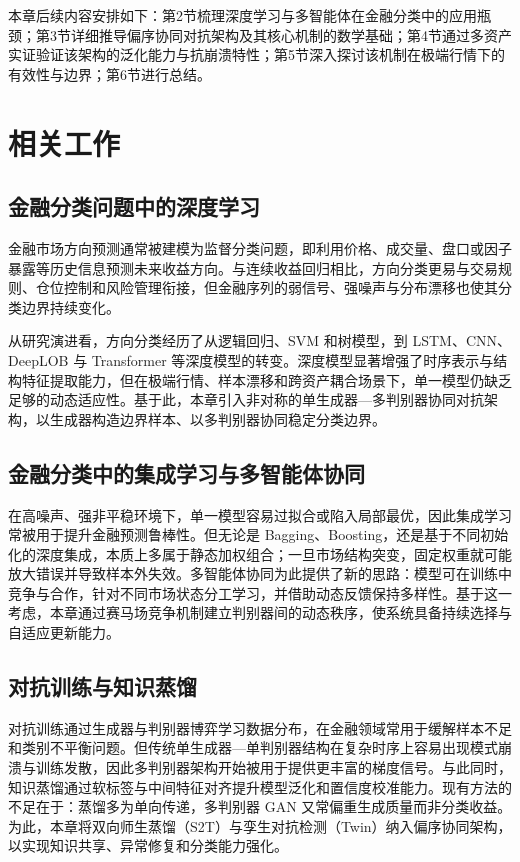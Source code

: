 本章后续内容安排如下：第2节梳理深度学习与多智能体在金融分类中的应用瓶颈；第3节详细推导偏序协同对抗架构及其核心机制的数学基础；第4节通过多资产实证验证该架构的泛化能力与抗崩溃特性；第5节深入探讨该机制在极端行情下的有效性与边界；第6节进行总结。

\section{相关工作}

\subsection{金融分类问题中的深度学习}

金融市场方向预测通常被建模为监督分类问题，即利用价格、成交量、盘口或因子暴露等历史信息预测未来收益方向。与连续收益回归相比，方向分类更易与交易规则、仓位控制和风险管理衔接，但金融序列的弱信号、强噪声与分布漂移也使其分类边界持续变化。

从研究演进看，方向分类经历了从逻辑回归、SVM 和树模型，到 LSTM、CNN、DeepLOB 与 Transformer 等深度模型的转变\cite{fischer2018deep,chen2019attlstm,sezer2018algorithmic,zhang2019DeepLOB,vaswani2017attention,ding2020hmsg,yoo2021dtml}。深度模型显著增强了时序表示与结构特征提取能力，但在极端行情、样本漂移和跨资产耦合场景下，单一模型仍缺乏足够的动态适应性。基于此，本章引入非对称的单生成器—多判别器协同对抗架构，以生成器构造边界样本、以多判别器协同稳定分类边界。

\subsection{金融分类中的集成学习与多智能体协同}

在高噪声、强非平稳环境下，单一模型容易过拟合或陷入局部最优，因此集成学习常被用于提升金融预测鲁棒性\cite{bailey2015pbo,gu2020empirical,lopezdeprado2018advances}。但无论是 Bagging、Boosting，还是基于不同初始化的深度集成，本质上多属于静态加权组合；一旦市场结构突变，固定权重就可能放大错误并导致样本外失效\cite{white2000realitycheck,hansen2005spa}。多智能体协同为此提供了新的思路：模型可在训练中竞争与合作，针对不同市场状态分工学习，并借助动态反馈保持多样性。基于这一考虑，本章通过赛马场竞争机制建立判别器间的动态秩序，使系统具备持续选择与自适应更新能力。

\subsection{对抗训练与知识蒸馏}

对抗训练通过生成器与判别器博弈学习数据分布，在金融领域常用于缓解样本不足和类别不平衡问题。但传统单生成器—单判别器结构在复杂时序上容易出现模式崩溃与训练发散，因此多判别器架构开始被用于提供更丰富的梯度信号。与此同时，知识蒸馏通过软标签与中间特征对齐提升模型泛化和置信度校准能力\cite{guo2017calibration}。现有方法的不足在于：蒸馏多为单向传递，多判别器 GAN 又常偏重生成质量而非分类收益。为此，本章将双向师生蒸馏（S2T）与孪生对抗检测（Twin）纳入偏序协同架构，以实现知识共享、异常修复和分类能力强化。

